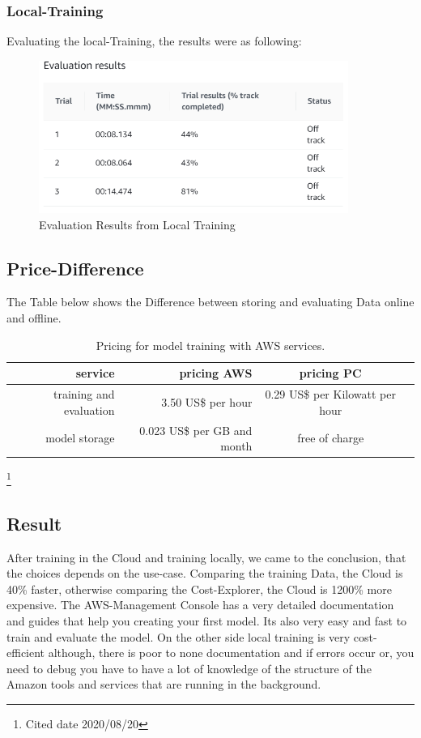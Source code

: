 \subsubsection{Local-Training}
Evaluating the local-Training, the results were as following: 
\begin{figure}[H]
    \centering
    \includegraphics[width=0.9\textwidth]{images/localEvaluation.PNG}
    \caption[]{Evaluation Results from Local Training}
    \label{fig:evLo}
\end{figure}
 
 
\subsection{Price-Difference}
The Table below shows the Difference between storing and evaluating Data online and offline.

\begin{table}[H]
\caption{Pricing for model training with AWS services.}
\label{tab:services}
\centering
\setlength{\tabcolsep}{5mm}
\def\arraystretch{1.25}
\begin{tabular}{|r|r|c|c|}
\hline
\textbf{service} & \textbf{pricing AWS} & \textbf{pricing PC} \\
\hline\hline
training and evaluation & 3.50 US\$ per hour & 0.29 US\$ per Kilowatt per hour \\
\hline
model storage & 0.023 US\$ per GB and month & free of charge\\
\hline
\end{tabular}
\end{table}
\footnote{Cited date 2020/08/20}

\subsection{Result}
After training in the Cloud and training locally, we came to the conclusion, that the choices depends on the use-case. Comparing the training Data, the Cloud is 40\% faster, otherwise comparing the Cost-Explorer, the Cloud is 1200\% more expensive. The AWS-Management Console has a very detailed documentation and guides that help you creating your first model. Its also very easy and fast to train and evaluate the model. On the other side local training is very cost-efficient although, there is poor to none documentation and if errors occur or, you need to debug you have to have a lot of knowledge of the structure of the Amazon tools and services that are running in the background. 



